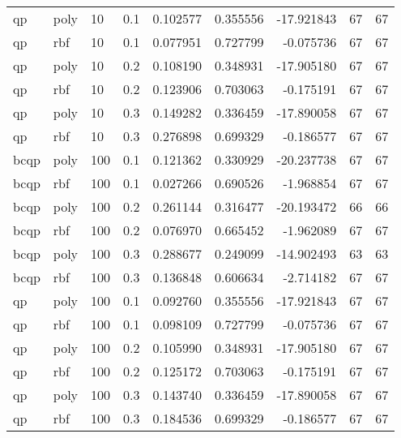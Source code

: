 \begin{tabular}{llllrrrrr}
  qp &   poly &  10 &     0.1 &  0.102577 &  0.355556 & -17.921843 &           67 &         67 \\
  qp &    rbf &  10 &     0.1 &  0.077951 &  0.727799 &  -0.075736 &           67 &         67 \\
  qp &   poly &  10 &     0.2 &  0.108190 &  0.348931 & -17.905180 &           67 &         67 \\
  qp &    rbf &  10 &     0.2 &  0.123906 &  0.703063 &  -0.175191 &           67 &         67 \\
  qp &   poly &  10 &     0.3 &  0.149282 &  0.336459 & -17.890058 &           67 &         67 \\
  qp &    rbf &  10 &     0.3 &  0.276898 &  0.699329 &  -0.186577 &           67 &         67 \\
bcqp &   poly & 100 &     0.1 &  0.121362 &  0.330929 & -20.237738 &           67 &         67 \\
bcqp &    rbf & 100 &     0.1 &  0.027266 &  0.690526 &  -1.968854 &           67 &         67 \\
bcqp &   poly & 100 &     0.2 &  0.261144 &  0.316477 & -20.193472 &           66 &         66 \\
bcqp &    rbf & 100 &     0.2 &  0.076970 &  0.665452 &  -1.962089 &           67 &         67 \\
bcqp &   poly & 100 &     0.3 &  0.288677 &  0.249099 & -14.902493 &           63 &         63 \\
bcqp &    rbf & 100 &     0.3 &  0.136848 &  0.606634 &  -2.714182 &           67 &         67 \\
  qp &   poly & 100 &     0.1 &  0.092760 &  0.355556 & -17.921843 &           67 &         67 \\
  qp &    rbf & 100 &     0.1 &  0.098109 &  0.727799 &  -0.075736 &           67 &         67 \\
  qp &   poly & 100 &     0.2 &  0.105990 &  0.348931 & -17.905180 &           67 &         67 \\
  qp &    rbf & 100 &     0.2 &  0.125172 &  0.703063 &  -0.175191 &           67 &         67 \\
  qp &   poly & 100 &     0.3 &  0.143740 &  0.336459 & -17.890058 &           67 &         67 \\
  qp &    rbf & 100 &     0.3 &  0.184536 &  0.699329 &  -0.186577 &           67 &         67 \\
\bottomrule
\end{tabular}

